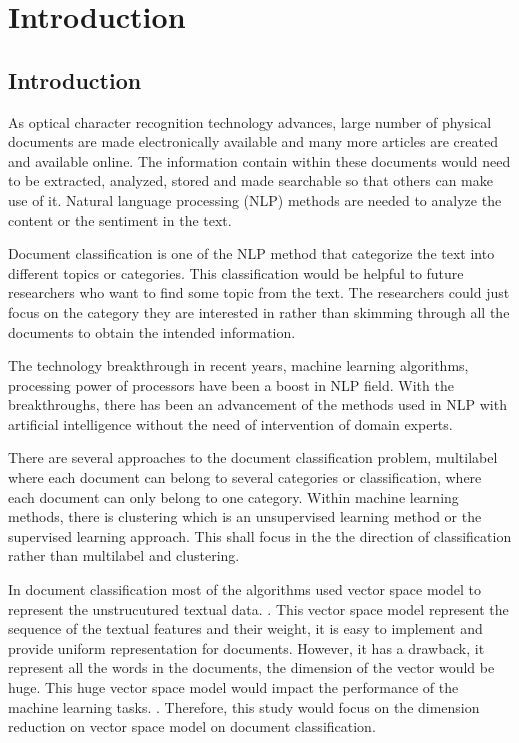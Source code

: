 \chapter{Introduction}
\section{Introduction}
As optical character recognition technology advances, large number of physical documents are 
made electronically available and many more articles are created and available online. The 
information contain within these documents would need to be extracted, analyzed, stored and 
made searchable so that others can make use of it. Natural language processing (NLP) methods 
are needed to analyze the content or the sentiment in the text.

Document classification is one 	of the NLP method that categorize the text into different topics or categories. This classification would be helpful to future researchers who want to find some topic from the text. The researchers could just focus on the category they are interested in rather than skimming through all the documents to obtain the intended information. 

The technology breakthrough in recent years, machine learning algorithms, processing power of processors have been a boost in NLP field. With the breakthroughs, there has been an advancement of the methods used in NLP with artificial intelligence without the need of intervention of domain experts. 

There are several approaches to the document classification problem, multilabel where 
each document can belong to several categories or classification, where each document can 
only belong to one category. Within machine learning methods, there is clustering which is an unsupervised learning method or the supervised learning approach. This shall focus in the the direction of classification rather than multilabel and clustering.

In document classification most of the algorithms used vector space model to represent the unstrucutured textual data. \cite{vectorSpaceModelText}. This vector space model represent the sequence of the textual features and their weight, it is easy to implement and provide uniform representation for documents. However, it has a drawback, it represent all the words in the documents, the dimension of the vector would be huge. This huge vector space model would impact the performance of the machine learning tasks. \cite{knnVectorSpaceReduction}. Therefore, this study would focus on the dimension reduction on vector space model on document classification.

